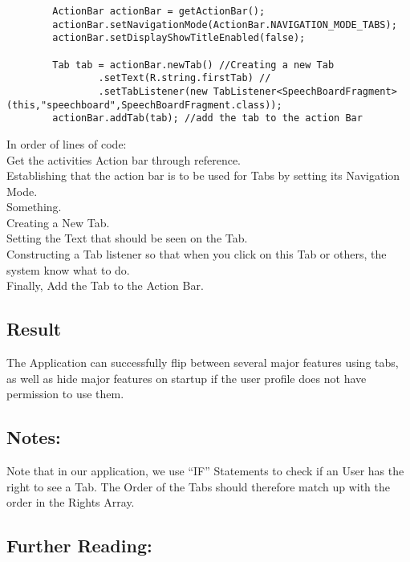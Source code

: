 \begin{verbatim}
		ActionBar actionBar = getActionBar();
		actionBar.setNavigationMode(ActionBar.NAVIGATION_MODE_TABS); 
		actionBar.setDisplayShowTitleEnabled(false);
		
		Tab tab = actionBar.newTab() //Creating a new Tab
				.setText(R.string.firstTab) //
				.setTabListener(new TabListener<SpeechBoardFragment>(this,"speechboard",SpeechBoardFragment.class));
		actionBar.addTab(tab); //add the tab to the action Bar
\end{verbatim}
In order of lines of code:\\
Get the activities Action bar through reference.\\
Establishing that the action bar is to be used for Tabs by setting its Navigation Mode.\\
Something.\\
Creating a New Tab.\\
Setting the Text that should be seen on the Tab.\\
Constructing a Tab listener so that when you click on this Tab or others, the system know what to do.\\
Finally, Add the Tab to the Action Bar.\\

\subsection{Result}
The Application can successfully flip between several major features using tabs, as well as hide major features on startup if the user profile does not have permission to use them.

\subsection{Notes:}
Note that in our application, we use ``IF'' Statements to check if an User has the right to see a Tab.
The Order of the Tabs should therefore match up with the order in the Rights Array.

\subsection{Further Reading:}
